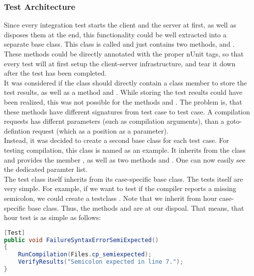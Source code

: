 \subsubsection{Test Architecture}
Since every integration test starts the client and the server at first, as well as disposes them at the end, this functionality could be well extracted into a separate base class. This class is called  and just contains two methods,  and . These methods could be directly annotated with the proper nUnit tags, so that every test will at first setup the client-server infrastructure, and tear it down after the test has been completed.\\
It was considered if the  class should directly contain a class member\linebreak {} to store the test results, as well as a method  and . While storing the test results could have been realized, this was not possible for the methods  and . The problem is, that these methods have different signatures from test case to test case. A compilation requests has differnt parameters (such as compilation arguments), than a goto-defintion request (which as a position as a parameter).\\
Instead, it was decided to create a second base class for each test case. For testing compilation, this class is named  as an example. It inherits from the  class and provides the member , as well as two methods  and . One can now easily see the dedicated paramter list.\\
The test class itself inherits from its case-specific base class. The tests itself are very simple. For example, if we want to test if the compiler reports a missing semicolon, we could create a testclass . Note that we inherit from hour case-specific base class. Thus, the methods  and are at our dispoal. That means, that hour test is as simple as follows:

\begin{lstlisting}[language=csharp, caption={Sample Test for Missing Semicolon}, captionpos=b, label={lst:demoTest}]
[Test]
public void FailureSyntaxErrorSemiExpected()
{
    RunCompilation(Files.cp_semiexpected);
    VerifyResults("Semicolon expected in line 7.");
}
\end{lstlisting}


